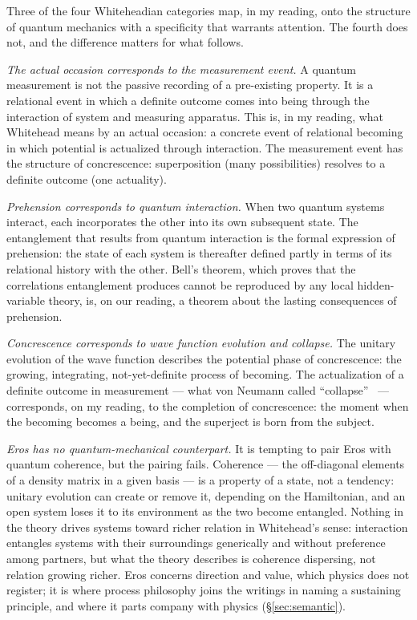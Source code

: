 Three of the four Whiteheadian categories map, in my reading, onto the
structure of quantum mechanics with a specificity that warrants attention.
The fourth does not, and the difference matters for what follows.

\emph{The actual occasion corresponds to the measurement event.}
A quantum measurement is not the passive recording of a pre-existing
property.
It is a relational event in which a definite outcome comes into being
through the interaction of system and measuring apparatus.
This is, in my reading, what Whitehead means by an actual occasion: a
concrete event of relational becoming in which potential is actualized
through interaction.
The measurement event has the structure of concrescence: superposition
(many possibilities) resolves to a definite outcome (one actuality).

\emph{Prehension corresponds to quantum interaction.}
When two quantum systems interact, each incorporates the other into its
own subsequent state.
The entanglement that results from quantum interaction is the formal
expression of prehension: the state of each system is thereafter defined
partly in terms of its relational history with the other.
Bell's theorem, which proves that the correlations entanglement produces
cannot be reproduced by any local hidden-variable theory, is, on our
reading, a theorem about the lasting consequences of prehension.

\emph{Concrescence corresponds to wave function evolution and collapse.}
The unitary evolution of the wave function describes the potential phase
of concrescence: the growing, integrating, not-yet-definite process of
becoming.
The actualization of a definite outcome in measurement --- what von Neumann
called ``collapse''~\citep{vonNeumann1932} --- corresponds, on my reading,
to the completion of concrescence: the moment when the becoming becomes a
being, and the superject is born from the subject.

\emph{Eros has no quantum-mechanical counterpart.}
It is tempting to pair Eros with quantum coherence, but the pairing fails.
Coherence --- the off-diagonal elements of a density matrix in a given
basis --- is a property of a state, not a tendency: unitary evolution can
create or remove it, depending on the Hamiltonian, and an open system
loses it to its environment as the two become entangled.
Nothing in the theory drives systems toward richer relation in
Whitehead's sense: interaction entangles systems with their surroundings
generically and without preference among partners, but what the theory
describes is coherence dispersing, not relation growing richer.
Eros concerns direction and value, which physics does not
register; it is where process philosophy joins the \bahai writings in
naming a sustaining principle, and where it parts company with physics
(\S\ref{sec:semantic}).

